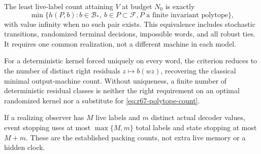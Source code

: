 \begin{theorem}\label{thm:r67-polytope}
The least live-label count attaining $V$ at budget $N_0$ is exactly
\begin{equation}\label{eq:r67-polytope-count}
 \min\{h(P,b): b\in\mathcal B_*,\ b\in P\subset\mathcal F,
                    P\text{ a finite invariant polytope}\},
\end{equation}
with value infinity when no such pair exists. This equivalence includes stochastic transitions, randomized terminal decisions, impossible words, and all robust ties. It requires one common realization, not a different machine in each model.

For a deterministic kernel forced uniquely on every word, the criterion reduces to the number of distinct right residuals $z\mapsto b(wz)$, recovering the classical minimal output-machine count. Without uniqueness, a finite number of deterministic residual classes is neither the right requirement on an optimal randomized kernel nor a substitute for \eqref{eq:r67-polytope-count}.

If a realizing observer has $M$ live labels and $m$ distinct actual decoder values, event stopping uses at most $\max\{M,m\}$ total labels and state stopping at most $M+m$. These are the established packing counts, not extra live memory or a hidden clock.
\end{theorem}
